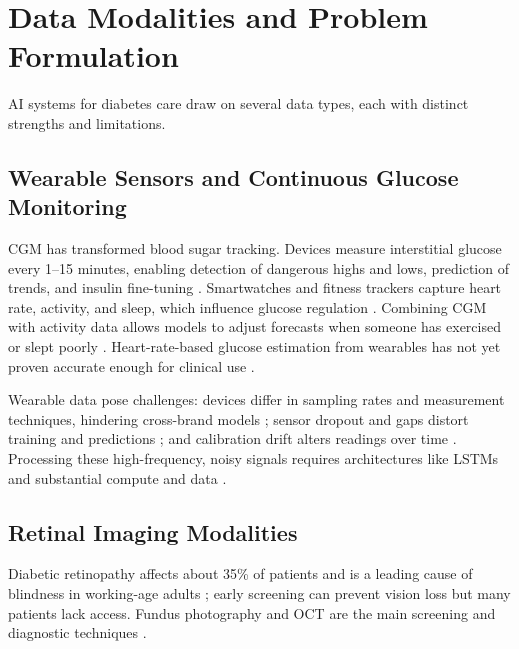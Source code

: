 \section{Data Modalities and Problem Formulation}

AI systems for diabetes care draw on several data types, each with distinct strengths and limitations.

\subsection{Wearable Sensors and Continuous Glucose Monitoring}

CGM has transformed blood sugar tracking. Devices measure interstitial glucose every 1--15 minutes, enabling detection of dangerous highs and lows, prediction of trends, and insulin fine-tuning \cite{alhaddad2022sense, contreras2018artificial, jacobs2023artificial}. Smartwatches and fitness trackers capture heart rate, activity, and sleep, which influence glucose regulation \cite{alhaddad2022sense, rodriguez2023applications}. Combining CGM with activity data allows models to adjust forecasts when someone has exercised or slept poorly \cite{contreras2018artificial, alhaddad2022sense}. Heart-rate-based glucose estimation from wearables has not yet proven accurate enough for clinical use \cite{zanelli2022diabetes, alhaddad2022sense}.

Wearable data pose challenges: devices differ in sampling rates and measurement techniques, hindering cross-brand models \cite{prioleau2025deep, langarica2024deep}; sensor dropout and gaps distort training and predictions \cite{xie2024processing, hirsch2024interruption}; and calibration drift alters readings over time \cite{alhaddad2022sense, jacobs2023artificial}. Processing these high-frequency, noisy signals requires architectures like LSTMs and substantial compute and data \cite{zhu2021deep, alam2024machine, martinsson2020blood}.

\subsection{Retinal Imaging Modalities}

Diabetic retinopathy affects about 35\% of patients and is a leading cause of blindness in working-age adults \cite{yau2012global}; early screening can prevent vision loss but many patients lack access. Fundus photography and OCT are the main screening and diagnostic techniques \cite{contreras2018artificial}.

